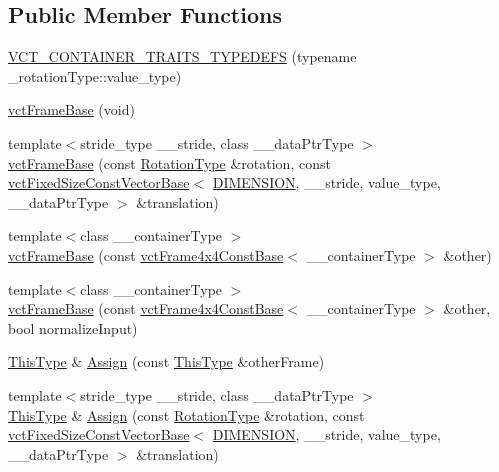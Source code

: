 \subsection*{Public Member Functions}
\begin{DoxyCompactItemize}
\item 
\hyperlink{classvct_frame_base_ae7a91d89635167df941960b1d087ae00}{V\+C\+T\+\_\+\+C\+O\+N\+T\+A\+I\+N\+E\+R\+\_\+\+T\+R\+A\+I\+T\+S\+\_\+\+T\+Y\+P\+E\+D\+E\+F\+S} (typename \+\_\+rotation\+Type\+::value\+\_\+type)
\item 
\hyperlink{classvct_frame_base_ac8a48dafaeb69f31b2bc40ba16ec8904}{vct\+Frame\+Base} (void)
\item 
{\footnotesize template$<$stride\+\_\+type \+\_\+\+\_\+stride, class \+\_\+\+\_\+data\+Ptr\+Type $>$ }\\\hyperlink{classvct_frame_base_a738a33cec4b25a85c5f2853e0266bf29}{vct\+Frame\+Base} (const \hyperlink{classvct_frame_base_a02e4eaad478400dd1d81e772caf3b01b}{Rotation\+Type} \&rotation, const \hyperlink{classvct_fixed_size_const_vector_base}{vct\+Fixed\+Size\+Const\+Vector\+Base}$<$ \hyperlink{classvct_frame_base_a4284a4e875533c13df90a20c0233e043ad25b85efd5e4c2687ddf38ae18cd88f0}{D\+I\+M\+E\+N\+S\+I\+O\+N}, \+\_\+\+\_\+stride, value\+\_\+type, \+\_\+\+\_\+data\+Ptr\+Type $>$ \&translation)
\item 
{\footnotesize template$<$class \+\_\+\+\_\+container\+Type $>$ }\\\hyperlink{classvct_frame_base_ad7c8211c2c810a607f93bc8b923c8125}{vct\+Frame\+Base} (const \hyperlink{classvct_frame4x4_const_base}{vct\+Frame4x4\+Const\+Base}$<$ \+\_\+\+\_\+container\+Type $>$ \&other)
\item 
{\footnotesize template$<$class \+\_\+\+\_\+container\+Type $>$ }\\\hyperlink{classvct_frame_base_a7082e42b3f5e93310c98ac89cc16e571}{vct\+Frame\+Base} (const \hyperlink{classvct_frame4x4_const_base}{vct\+Frame4x4\+Const\+Base}$<$ \+\_\+\+\_\+container\+Type $>$ \&other, bool normalize\+Input)
\item 
\hyperlink{classvct_frame_base_a076f1fe4fc957faa0d1ff7450d1cb768}{This\+Type} \& \hyperlink{classvct_frame_base_aa24c98e6e6cd9edc199148214b84f4c0}{Assign} (const \hyperlink{classvct_frame_base_a076f1fe4fc957faa0d1ff7450d1cb768}{This\+Type} \&other\+Frame)
\item 
{\footnotesize template$<$stride\+\_\+type \+\_\+\+\_\+stride, class \+\_\+\+\_\+data\+Ptr\+Type $>$ }\\\hyperlink{classvct_frame_base_a076f1fe4fc957faa0d1ff7450d1cb768}{This\+Type} \& \hyperlink{classvct_frame_base_ace948997b56ff592340a9811c2a34657}{Assign} (const \hyperlink{classvct_frame_base_a02e4eaad478400dd1d81e772caf3b01b}{Rotation\+Type} \&rotation, const \hyperlink{classvct_fixed_size_const_vector_base}{vct\+Fixed\+Size\+Const\+Vector\+Base}$<$ \hyperlink{classvct_frame_base_a4284a4e875533c13df90a20c0233e043ad25b85efd5e4c2687ddf38ae18cd88f0}{D\+I\+M\+E\+N\+S\+I\+O\+N}, \+\_\+\+\_\+stride, value\+\_\+type, \+\_\+\+\_\+data\+Ptr\+Type $>$ \&translation)

\end{DoxyCompactItemize}
